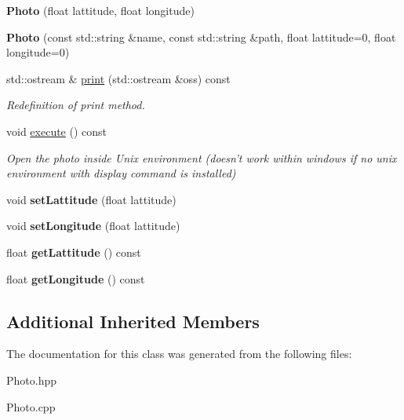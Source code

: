 \begin{DoxyCompactItemize}
\item 
\hypertarget{class_photo_a839aaf99fe6a121bed99f8e0c797557b}{{\bfseries Photo} (float lattitude, float longitude)}\label{class_photo_a839aaf99fe6a121bed99f8e0c797557b}

\item 
\hypertarget{class_photo_aa3e3af9f5042f50accabb536908a1226}{{\bfseries Photo} (const std\-::string \&name, const std\-::string \&path, float lattitude=0, float longitude=0)}\label{class_photo_aa3e3af9f5042f50accabb536908a1226}

\item 
\hypertarget{class_photo_aad7279a92e29492342ce2708b3d7e417}{std\-::ostream \& \hyperlink{class_photo_aad7279a92e29492342ce2708b3d7e417}{print} (std\-::ostream \&oss) const }\label{class_photo_aad7279a92e29492342ce2708b3d7e417}

\begin{DoxyCompactList}\small\item\em Redefinition of print method. \end{DoxyCompactList}\item 
\hypertarget{class_photo_a9d4920cbf6fc466630e3a8b4d5df84db}{void \hyperlink{class_photo_a9d4920cbf6fc466630e3a8b4d5df84db}{execute} () const }\label{class_photo_a9d4920cbf6fc466630e3a8b4d5df84db}

\begin{DoxyCompactList}\small\item\em Open the photo inside Unix environment (doesn't work within windows if no unix environment with display command is installed) \end{DoxyCompactList}\item 
\hypertarget{class_photo_a2e7159e2ebbd5ca993ae746825e4700b}{void {\bfseries set\-Lattitude} (float lattitude)}\label{class_photo_a2e7159e2ebbd5ca993ae746825e4700b}

\item 
\hypertarget{class_photo_a9214ffc09168ae3a8134381c22266f91}{void {\bfseries set\-Longitude} (float lattitude)}\label{class_photo_a9214ffc09168ae3a8134381c22266f91}

\item 
\hypertarget{class_photo_ab02d0f97243f927d0fbf311712a96118}{float {\bfseries get\-Lattitude} () const }\label{class_photo_ab02d0f97243f927d0fbf311712a96118}

\item 
\hypertarget{class_photo_a02787b27b9d7c919e9ecfaa2e99a1862}{float {\bfseries get\-Longitude} () const }\label{class_photo_a02787b27b9d7c919e9ecfaa2e99a1862}

\end{DoxyCompactItemize}
\subsection*{Additional Inherited Members}


The documentation for this class was generated from the following files\-:\begin{DoxyCompactItemize}
\item 
Photo.\-hpp\item 
Photo.\-cpp\end{DoxyCompactItemize}
